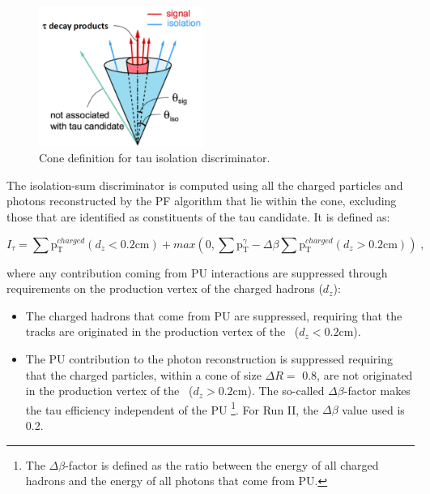 \begin{figure}[ht]
  \begin{center}
    \includegraphics[width=0.48\textwidth]{figuras/Chapter3/taucone}
    \caption{Cone definition for tau  isolation discriminator.}
    \label{fig:taucone}
  \end{center}
\end{figure} 

\noindent The isolation-sum discriminator is computed using all the 
charged particles and photons reconstructed by the PF algorithm that lie 
within the cone, excluding those that are identified
as constituents of the tau candidate. It is defined as:

\begin{equation} \label{eq:TauIso}
I_{\tau} = \sum \textrm{p}_{\textrm{T}}^{charged} (d_{z} < 0.2 \textrm{cm}) + 
max\left(0, \sum \textrm{p}_{\textrm{T}}^{\gamma}- \Delta\beta \sum \textrm{p}_{\textrm{T}}^{charged} (d_{z} > 0.2 \textrm{cm}) \right) \; ,
\end{equation}

\noindent where any contribution coming from PU interactions are suppressed through 
requirements on the production vertex of the charged hadrons ($d_{z}$): 

\begin{itemize}
 \item The charged hadrons that come from PU are suppressed, requiring that the tracks are originated 
 in the production vertex of the \tauh~($d_{z} < 0.2 \textrm{cm}$).
 \item The PU contribution to the photon reconstruction is suppressed requiring that the charged 
 particles, within a cone of size $\Delta R =$ 0.8, are not originated in the 
 production vertex  of the \tauh~($d_{z} > 0.2 \textrm{cm}$). The so-called 
 $\Delta \beta$-factor makes the tau efficiency independent of the PU \footnote{
 The $\Delta \beta$-factor is defined as the ratio between the energy of all 
 charged hadrons and the energy of all photons that come from PU.}. For Run II, the  $\Delta \beta$ value used is 0.2.
\end{itemize}

